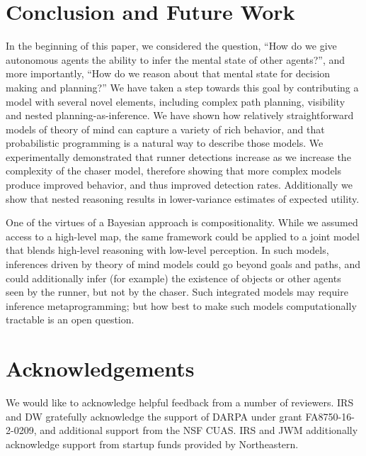 \documentclass[twoside]{article}
\begin{document}
\vskip -0.1in
\section{Conclusion and Future Work}
\vskip -0.1in

In the beginning of this paper, we considered the question, ``How do we give autonomous agents the ability to infer the mental state of other agents?'', and more importantly, ``How do we reason about that mental state for decision making and planning?'' 
We have taken a step towards this goal by contributing a model with several novel elements, including complex path planning, visibility and nested planning-as-inference.
We %
have shown how relatively straightforward models of theory of mind can capture a variety of rich behavior, and that probabilistic programming is a natural way to describe those models. 
We experimentally demonstrated that runner detections increase as we increase the complexity of the chaser model, therefore showing that more complex models produce improved behavior, and thus improved detection rates. Additionally we show that nested reasoning results in lower-variance estimates of expected utility.

One of the virtues of a Bayesian approach is compositionality.  While
we assumed access to a high-level map, the same framework could be
applied to a joint model that blends high-level reasoning with
low-level perception.  In such models, inferences driven by theory of
mind models could go beyond goals and paths, and could additionally
infer (for example) the existence of objects or other agents seen by
the runner, but not by the chaser.  Such integrated models may
require inference metaprogramming; but how best to make
such models computationally tractable is an open question.

\section{Acknowledgements}

We would like to acknowledge helpful feedback from a number of reviewers. IRS and DW  gratefully acknowledge the support of DARPA under grant FA8750-16-2-0209, and additional support from the NSF CUAS. IRS and JWM additionally acknowledge support from startup funds provided by Northeastern.

%
%
\printbibliography
\end{document}
